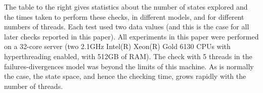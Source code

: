 %
The table to the right gives statistics about the number of states explored
and the times taken to perform these checks, in different models, and for
different numbers of threads.  Each test used two data values (and this is the
case for all later checks reported in this paper).  All
experiments in this paper were performed on a 32-core server (two 2.1GHz
Intel(R) Xeon(R) Gold 6130 CPUs with hyperthreading enabled, with 512GB of
RAM).  The check with 5 threads in the failures-divergences model was beyond
the limits of this machine.  As is normally the case, the state space, and
hence the checking time, grows rapidly with the number of threads.   
\end{window}


